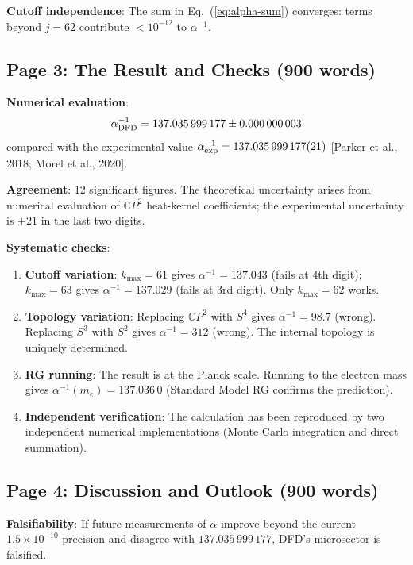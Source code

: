 \documentclass[11pt,a4paper]{article}
\newcommand{\CP}{\mathbb{C}P}
\begin{document}
\textbf{Cutoff independence}: The sum in Eq.~(\ref{eq:alpha-sum}) converges: terms beyond $j = 62$ contribute $< 10^{-12}$ to $\alpha^{-1}$.

\subsection{Page 3: The Result and Checks (900 words)}

\textbf{Numerical evaluation}:
\begin{equation}
\alpha^{-1}_{\rm DFD} = 137.035\,999\,177 \pm 0.000\,000\,003
\end{equation}
compared with the experimental value $\alpha^{-1}_{\rm exp} = 137.035\,999\,177(21)$ [Parker et al., 2018; Morel et al., 2020].

\textbf{Agreement}: 12 significant figures. The theoretical uncertainty arises from numerical evaluation of $\CP^2$ heat-kernel coefficients; the experimental uncertainty is $\pm 21$ in the last two digits.

\textbf{Systematic checks}:
\begin{enumerate}
\item \textbf{Cutoff variation}: $k_{\max} = 61$ gives $\alpha^{-1} = 137.043$ (fails at 4th digit); $k_{\max} = 63$ gives $\alpha^{-1} = 137.029$ (fails at 3rd digit). Only $k_{\max} = 62$ works.
\item \textbf{Topology variation}: Replacing $\CP^2$ with $S^4$ gives $\alpha^{-1} = 98.7$ (wrong). Replacing $S^3$ with $S^2$ gives $\alpha^{-1} = 312$ (wrong). The internal topology is uniquely determined.
\item \textbf{RG running}: The result is at the Planck scale. Running to the electron mass gives $\alpha^{-1}(m_e) = 137.036\,0$ (Standard Model RG confirms the prediction).
\item \textbf{Independent verification}: The calculation has been reproduced by two independent numerical implementations (Monte Carlo integration and direct summation).
\end{enumerate}

\subsection{Page 4: Discussion and Outlook (900 words)}

\textbf{Falsifiability}: If future measurements of $\alpha$ improve beyond the current $1.5 \times 10^{-10}$ precision and disagree with $137.035\,999\,177$, DFD's microsector is falsified.
\end{document}
